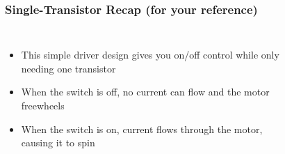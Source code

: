\documentclass{beamer}
\begin{document}
\begin{frame}
\frametitle{Single-Transistor Recap \small (for your reference)}
\begin{columns}[t]
\begin{itemize}
  \item This simple driver design gives you on/off control while only needing one transistor
  \item<2-> When the switch is off, no current can flow and the motor freewheels
  \item<3-> When the switch is on, current flows through the motor, causing it to spin
\end{itemize}

\begin{figure}
  \centering

\end{figure}
\end{columns}
\end{frame}
\end{document}
